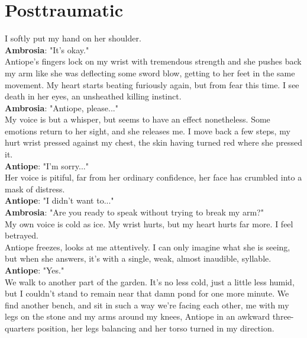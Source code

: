 \documentclass{report}
\newcommand{\speaker}[1]{
	\textbf{#1}: 
}
\newcommand{\gsection}[1]{
	\section*{#1}
	\label{#1}
}
\begin{document}
\gsection{Posttraumatic}

I softly put my hand on her shoulder.\\

\speaker{Ambrosia} "It's okay."\\

Antiope's fingers lock on my wrist with tremendous strength and she pushes back my arm like she was deflecting some sword blow, getting to her feet in the same movement. My heart starts beating furiously again, but from fear this time. I see death in her eyes, an unsheathed killing instinct.\\

\speaker{Ambrosia} "Antiope, please..."\\

My voice is but a whisper, but seems to have an effect nonetheless. Some emotions return to her sight, and she releases me. I move back a few steps, my hurt wrist pressed against my chest, the skin having turned red where she pressed it.\\

\speaker{Antiope} "I'm sorry..."\\

Her voice is pitiful, far from her ordinary confidence, her face has crumbled into a mask of distress.\\

\speaker{Antiope} "I didn't want to..."\\

\speaker{Ambrosia} "Are you ready to speak without trying to break my arm?"\\

My own voice is cold as ice. My wrist hurts, but my heart hurts far more. I feel betrayed.\\

Antiope freezes, looks at me attentively. I can only imagine what she is seeing, but when she answers, it's with a single, weak, almost inaudible, syllable.\\

\speaker{Antiope} "Yes."\\

We walk to another part of the garden. It's no less cold, just a little less humid, but I couldn't stand to remain near that damn pond for one more minute. We find another bench, and sit in such a way we're facing each other, me with my legs on the stone and my arms around my knees, Antiope in an awkward three-quarters position, her legs balancing and her torso turned in my direction.\\
\end{document}
